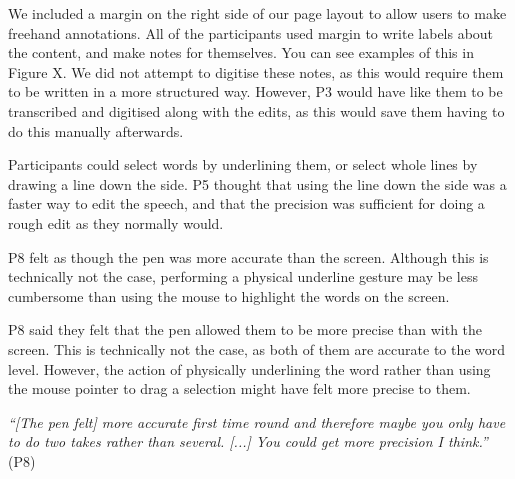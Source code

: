 

We included a margin on the right side of our page layout to allow users to make freehand annotations. All of the
participants used margin to write labels about the content, and make notes for themselves. You can see examples of this
in Figure X. We did not attempt to digitise these notes, as this would require them to be written in a more structured
way. However, P3 would have like them to be transcribed and digitised along with the edits, as this would save them
having to do this manually afterwards.





Participants could select words by underlining them, or select whole lines by drawing a line down the side. P5 thought
that using the line down the side was a faster way to edit the speech, and that the precision was sufficient for
doing a rough edit as they normally would.

P8 felt as though
the pen was more accurate than the screen. Although this is technically not the case, performing a physical underline
gesture may be less cumbersome than using the mouse to highlight the words on the screen.

P8 said they felt that the pen allowed them to be more precise than with the screen. This is technically not the case,
as both of them are accurate to the word level. However, the action of physically underlining the word rather
than using the mouse pointer to drag a selection might have felt more precise to them.

\textit{``[The pen felt] more accurate first time round and therefore maybe you only have to do two takes rather than
several. [...] You could get more precision I think.''} (P8)


